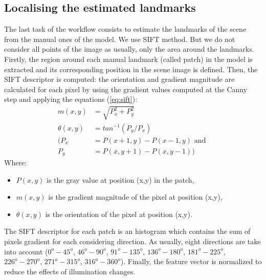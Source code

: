 \documentclass[twoside,twocolumn,10pt]{article}
\begin{document}
\subsection{Localising the estimated landmarks}
The last task of the workflow consists to estimate the landmarks of the scene from the manual ones of the model. We use SIFT \cite{lowe2004distinctive} method. But we do not consider all points of the image as usually, only the area around the landmarks. Firstly, the region around each manual landmark (called patch) in the model is extracted and its corresponding position in the scene image is defined. Then, the SIFT descriptor is computed: the orientation and gradient magnitude are calculated for each pixel by using the gradient values computed at the Canny step and applying the equations (\ref{eq:sift}):
\begin{equation}
\label{eq:sift}
\begin{split}
	m(x,y) &= \sqrt{P_x^2 + P_y^2} \\
	\theta(x,y)& = tan^{-1}(P_y/P_x) \\
	(P_x &= P(x+1,y) - P(x-1,y) \text{ and } \\
	P_y &= P(x,y+1) - P(x,y-1) )
\end{split}
\end{equation}
Where:
\begin{itemize}
	\item $P(x,y)$ is the gray value at position (x,y) in the patch,
	\item $m(x,y)$ is the gradient magnitude of the pixel at position (x,y),
	\item $\theta(x,y)$ is the orientation of the pixel at position (x,y).
\end{itemize}
The SIFT descriptor for each patch is an histogram which contains the sum of pixels gradient for each considering direction. As usually, eight directions are take into account ($0^o - 45^o$, $46^o - 90^o$, $91^o - 135^o$, $136^o - 180^o$, $181^o - 225^o$, $226^o - 270^o$, $271^o - 315^o$, $316^o - 360^o$). Finally, the feature vector is normalized to reduce the effects of illumination changes.
\end{document}
